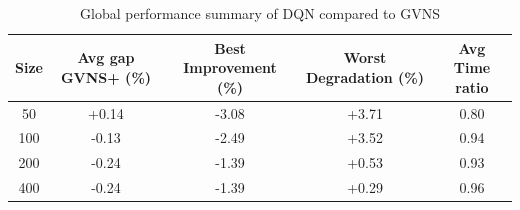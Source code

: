 \begin{table}[ht]
\centering
\footnotesize
\setlength{\tabcolsep}{4pt}
\caption{Global performance summary of DQN compared to GVNS}
\vspace{3mm}
\begin{tabular}{ccccc}
\toprule
\textbf{Size} & \textbf{Avg gap GVNS+ (\%)} & \textbf{Best Improvement (\%)} & \textbf{Worst Degradation (\%)} & \textbf{Avg Time ratio} \\
\midrule
50  & +0.14 & -3.08 & +3.71 & 0.80 \\
100 & -0.13 & -2.49 & +3.52 & 0.94 \\
200 & -0.24 & -1.39 & +0.53 & 0.93 \\
400 & -0.24 & -1.39 & +0.29 & 0.96 \\
\bottomrule
\end{tabular}
\label{tab:dqn_global_summary}
\end{table}